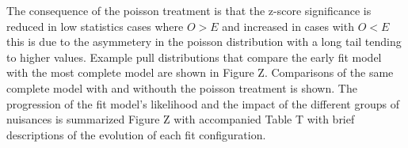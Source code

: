 The consequence of the poisson treatment is that the z-score significance is reduced in low statistics cases where $O>E$ and increased in cases with $O<E$ this is due to the asymmetery in the poisson distribution with a long tail tending to higher values. Example pull distributions that compare the early fit model with the most complete model are shown in Figure Z. Comparisons of the same complete model with and withouth the poisson treatment is shown. The progression of the fit model's likelihood and the impact of the different groups of nuisances is summarized Figure Z with accompanied Table T with brief descriptions of the evolution of each fit configuration. 
 
 




